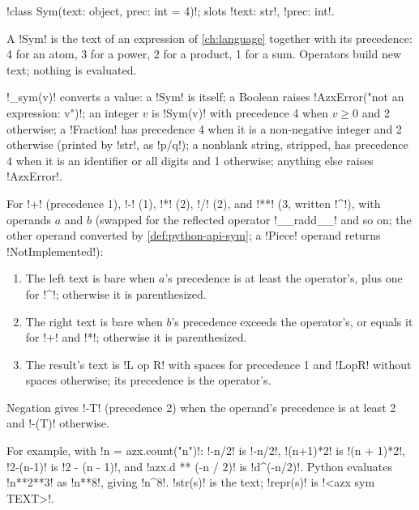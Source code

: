\begin{signature}
\py!class Sym(text: object, prec: int = 4)!; slots \py!text: str!, \py!prec: int!.
\end{signature}

A \py!Sym! is the text of an expression of \cref{ch:language} together with its precedence: 4 for an atom, 3 for a power, 2 for a product, 1 for a sum. Operators build new text; nothing is evaluated.

\begin{definition}\label{def:python-api-sym}
\py!_sym(v)! converts a value: a \py!Sym! is itself; a Boolean raises \code!AzxError("not an expression: v")!; an integer $v$ is \py!Sym(v)! with precedence 4 when $v\ge0$ and 2 otherwise; a \py!Fraction! has precedence 4 when it is a non-negative integer and 2 otherwise (printed by \py!str!, as \code!p/q!); a nonblank string, stripped, has precedence 4 when it is an identifier or all digits and 1 otherwise; anything else raises \py!AzxError!.
\end{definition}

\begin{algorithm}\label{alg:python-api-sym-op}
\leavevmode
For \code!+! (precedence 1), \code!-! (1), \code!*! (2), \code!/! (2), and \code!**! (3, written \code!^!), with operands $a$ and $b$ (swapped for the reflected operator \code!__radd__! and so on; the other operand converted by \cref{def:python-api-sym}; a \py!Piece! operand returns \py!NotImplemented!):
\begin{enumerate}
\item The left text is bare when $a$'s precedence is at least the operator's, plus one for \code!^!; otherwise it is parenthesized.
\item The right text is bare when $b$'s precedence exceeds the operator's, or equals it for \code!+! and \code!*!; otherwise it is parenthesized.
\item The result's text is \code!L op R! with spaces for precedence 1 and \code!LopR! without spaces otherwise; its precedence is the operator's.
\end{enumerate}
Negation gives \code!-T! (precedence 2) when the operand's precedence is at least 2 and \code!-(T)! otherwise.
\end{algorithm}

For example, with \code!n = azx.count("n")!: \py!-n/2! is \code!-n/2!, \py!(n+1)*2! is \code!(n + 1)*2!, \py!2-(n-1)! is \code!2 - (n - 1)!, and \py!azx.d ** (-n / 2)! is \code!d^(-n/2)!. Python evaluates \py!n**2**3! as \py!n**8!, giving \code!n^8!. \py!str(s)! is the text; \py!repr(s)! is \code!<azx sym TEXT>!.


